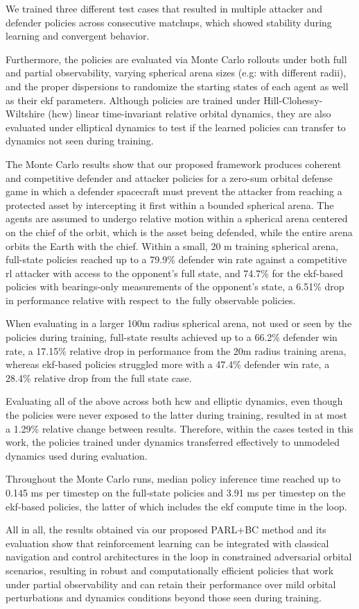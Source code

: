 We trained three different test cases that resulted in multiple attacker and defender policies across consecutive matchups, which showed stability during learning and convergent behavior.

Furthermore, the policies are evaluated via Monte Carlo rollouts under both full and partial observability, varying spherical arena sizes (e.g: with different radii), and the proper dispersions to randomize the starting states of each agent as well as their \acs{ekf} parameters. Although policies are trained under Hill-Clohessy-Wiltshire (\acs{hcw}) linear time-invariant relative orbital dynamics, they are also evaluated under elliptical dynamics to test if the learned policies can transfer to dynamics not seen during training.

The Monte Carlo results show that our proposed framework produces coherent and competitive defender and attacker policies for a zero-sum orbital defense game in which a defender spacecraft must prevent the attacker from reaching a protected asset by intercepting it first within a bounded spherical arena. The agents are assumed to undergo relative motion within a spherical arena centered on the chief of the orbit, which is the asset being defended, while the entire arena orbits the Earth with the chief. Within a small, 20 m training spherical arena, full-state policies reached up to a 79.9\% defender win rate against a competitive \acs{rl} attacker with access to the opponent's full state, and 74.7\% for the \acs{ekf}-based policies with bearings-only measurements of the opponent's state, a 6.51\% drop in performance relative with respect to\ the fully observable policies.

When evaluating in a larger 100m radius spherical arena, not used or seen by the policies during training, full-state results achieved up to a 66.2\% defender win rate, a 17.15\% relative drop in performance from the 20m radius training arena, whereas \acs{ekf}-based policies struggled more with a 47.4\% defender win rate, a 28.4\% relative drop from the full state case. 

Evaluating all of the above across both \acs{hcw} and elliptic dynamics, even though the policies were never exposed to the latter during training, resulted in at most a 1.29\% relative change between results. Therefore, within the cases tested in this work, the policies trained under dynamics transferred effectively to unmodeled dynamics used during evaluation.

Throughout the Monte Carlo runs, median policy inference time reached up to 0.145 ms per timestep on the full-state policies and 3.91 ms per timestep on the \acs{ekf}-based policies, the latter of which includes the \acs{ekf} compute time in the loop.

All in all, the results obtained via our proposed PARL+BC method and its evaluation show that reinforcement learning can be integrated with classical navigation and control architectures in the loop in constrained adversarial orbital scenarios, resulting in robust and computationally efficient policies that work under partial observability and can retain their performance over mild orbital perturbations and dynamics conditions beyond those seen during training.
